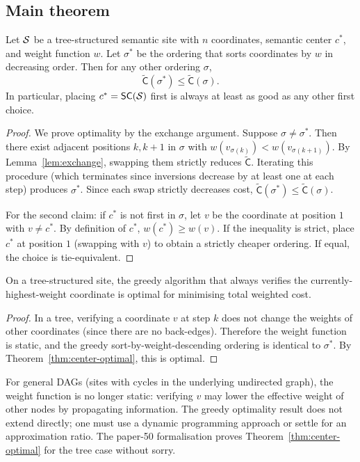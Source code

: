 \documentclass[11pt]{article}
\newcommand{\SC}{\mathsf{SC}}               %
\newcommand{\VerCost}{\mathsf{C}}           %
\newcommand{\wtotal}{\widetilde{\VerCost}}  %
\newcommand{\sortord}{\sigma^{*}}           %
\newcommand{\anyord}{\sigma}                %
\newcommand{\wt}{w}                         %
\begin{document}
\subsection{Main theorem}

\begin{theorem}\label{thm:center-optimal}
Let $\mathcal{S}$ be a tree-structured semantic site with $n$ coordinates,
semantic center $c^*$, and weight function $\wt$.  Let $\sortord$ be
the ordering that sorts coordinates by $\wt$ in decreasing order.
Then for any other ordering $\anyord$,
\[
  \wtotal(\sortord) \leq \wtotal(\anyord).
\]
In particular, placing $c^* = \SC(\Site)$ first is always at least as
good as any other first choice.
\end{theorem}
\begin{proof}
We prove optimality by the exchange argument.  Suppose $\anyord \neq
\sortord$.  Then there exist adjacent positions $k, k{+}1$ in $\anyord$
with $\wt(v_{\anyord(k)}) < \wt(v_{\anyord(k+1)})$.  By
Lemma~\ref{lem:exchange}, swapping them strictly reduces $\wtotal$.
Iterating this procedure (which terminates since inversions decrease by
at least one at each step) produces $\sortord$.  Since each swap
strictly decreases cost, $\wtotal(\sortord) \leq \wtotal(\anyord)$.

For the second claim: if $c^*$ is not first in $\anyord$, let $v$ be
the coordinate at position $1$ with $v \neq c^*$.  By definition of
$c^*$, $\wt(c^*) \geq \wt(v)$.  If the inequality is strict, place
$c^*$ at position $1$ (swapping with $v$) to obtain a strictly cheaper
ordering.  If equal, the choice is tie-equivalent.
\end{proof}

\begin{corollary}\label{cor:greedy}
On a tree-structured site, the greedy algorithm that always verifies
the currently-highest-weight coordinate is optimal for minimising
total weighted cost.
\end{corollary}
\begin{proof}
In a tree, verifying a coordinate $v$ at step $k$ does not change the
weights of other coordinates (since there are no back-edges).
Therefore the weight function is static, and the greedy
sort-by-weight-descending ordering is identical to $\sortord$.  By
Theorem~\ref{thm:center-optimal}, this is optimal.
\end{proof}

\begin{remark}
For general DAGs (sites with cycles in the underlying undirected
graph), the weight function is no longer static: verifying $v$ may
lower the effective weight of other nodes by propagating information.
The greedy optimality result does not extend directly; one must use a
dynamic programming approach or settle for an approximation ratio.
The paper-50 \LEAN{} formalisation proves
Theorem~\ref{thm:center-optimal} for the tree case without sorry.
\end{remark}
\end{document}
